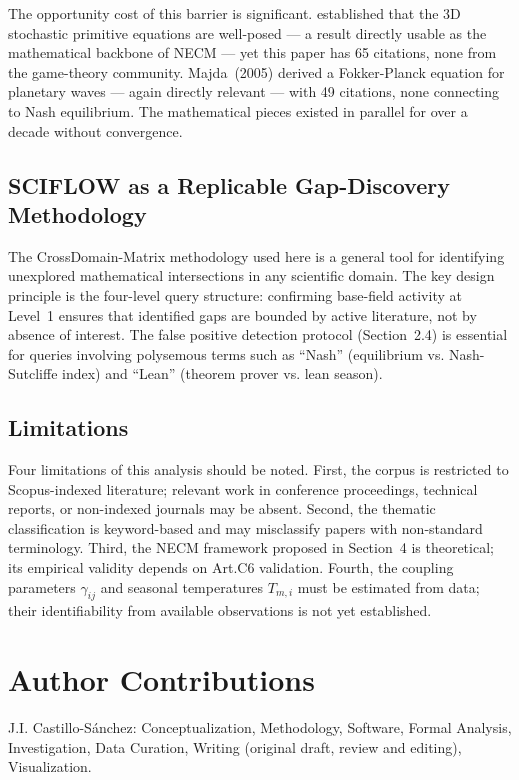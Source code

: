 \documentclass[gmd, manuscript]{copernicus}
\begin{document}
The opportunity cost of this barrier is significant. \citet{Debussche2012}
established that the 3D stochastic primitive equations are
well-posed — a result directly usable as the mathematical backbone of
NECM — yet this paper has 65 citations, none from the game-theory
community. Majda~(2005) derived a Fokker-Planck equation for planetary
waves — again directly relevant — with 49 citations, none connecting
to Nash equilibrium. The mathematical pieces existed in parallel for
over a decade without convergence.

\subsection{SCIFLOW as a Replicable Gap-Discovery Methodology}

The CrossDomain-Matrix methodology used here is a general tool for
identifying unexplored mathematical intersections in any scientific
domain. The key design principle is the four-level query structure:
confirming base-field activity at Level~1 ensures that identified gaps
are bounded by active literature, not by absence of interest. The false
positive detection protocol (Section~2.4) is essential for queries
involving polysemous terms such as ``Nash'' (equilibrium vs.
Nash-Sutcliffe index) and ``Lean'' (theorem prover vs. lean season).

\subsection{Limitations}

Four limitations of this analysis should be noted. First, the corpus
is restricted to Scopus-indexed literature; relevant work in conference
proceedings, technical reports, or non-indexed journals may be absent.
Second, the thematic classification is keyword-based and may
misclassify papers with non-standard terminology. Third, the NECM
framework proposed in Section~4 is theoretical; its empirical validity
depends on Art.C6 validation. Fourth, the coupling parameters
$\gamma_{ij}$ and seasonal temperatures $T_{m,i}$ must be estimated
from data; their identifiability from available observations is not
yet established.



\section*{Author Contributions}

J.I. Castillo-Sánchez: Conceptualization, Methodology, Software,
Formal Analysis, Investigation, Data Curation, Writing (original draft,
review and editing), Visualization.
\end{document}
